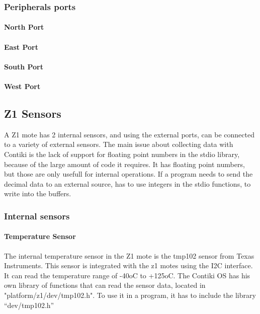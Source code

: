 \subsubsection{Peripherals ports}

\paragraph{North Port}

\paragraph{East Port}


\paragraph{South Port}


\paragraph{West Port}


\subsection{Z1 Sensors}

A Z1 mote has 2 internal sensors,
	and using the external ports,
	can be connected to a variety of external sensors.
The main issue about collecting data with Contiki is the lack of support for floating point numbers in the stdio library,
	because of the large amount of code it requires.
It has floating point numbers,
	but those are only usefull for internal operations.
If a program needs to send the decimal data to an external source,
	has to use integers in the stdio functions,
	to write into the buffers.


\subsubsection{Internal sensors}

\paragraph{Temperature Sensor}
The internal temperature sensor in the Z1 mote is the tmp102 sensor from Texas Instruments.
This sensor is integrated with the z1 motes using the I2C interface.
It can read the temperature range of -40oC to +125oC.
The Contiki OS has his own library of functions that can read the sensor data,
	located in "platform/z1/dev/tmp102.h".
To use it in a program,
	it has to include the library “dev/tmp102.h” 

